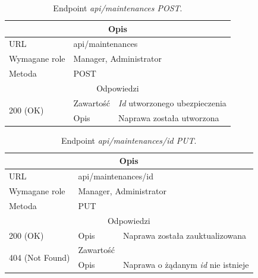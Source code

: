 \documentclass[eng,printmode,openany]{mgr}
\begin{document}
	\begin{table}[H]
		\caption{Endpoint \textit{api/maintenances POST}.}
		\begin{tabularx}{\textwidth}{|l|l|X|}
			\hline
			\multicolumn{3}{|c|}{Opis}
			\\ \hline
			URL                       & \multicolumn{2}{l|}{api/maintenances}
			\\ \hline
			Wymagane role             & \multicolumn{2}{l|}{Manager, Administrator}
			\\ \hline
			Metoda                    & \multicolumn{2}{l|}{POST}
			\\ \hline
			\multicolumn{3}{|c|}{Odpowiedzi}
			\\ \hline
			\multirow{2}{*}{200 (OK)} 		& Zawartość     & \textit{Id} utworzonego ubezpieczenia
			\\ \cline{2-3}                  & Opis         	& Naprawa została utworzona
			\\ \hline
		\end{tabularx}
	\end{table}
	
	\begin{table}[H]
		\caption{Endpoint \textit{api/maintenances/id PUT}.}
		\begin{tabularx}{\textwidth}{|l|l|X|}
			\hline
			\multicolumn{3}{|c|}{Opis}
			\\ \hline
			URL                       & \multicolumn{2}{l|}{api/maintenances/id}
			\\ \hline
			Wymagane role             & \multicolumn{2}{l|}{Manager, Administrator}
			\\ \hline
			Metoda                    & \multicolumn{2}{l|}{PUT}
			\\ \hline
			\multicolumn{3}{|c|}{Odpowiedzi}
			\\ \hline
			200 (OK) 		                        & Opis      	& Naprawa została zauktualizowana
			\\ \hline
			\multirow{2}{*}{404 (Not Found)} 	    & Zawartość     & 
			\\ \cline{2-3}                          & Opis          & Naprawa o żądanym \textit{id} nie istnieje
			\\ \hline
		\end{tabularx}
	\end{table}
	
\end{document}
